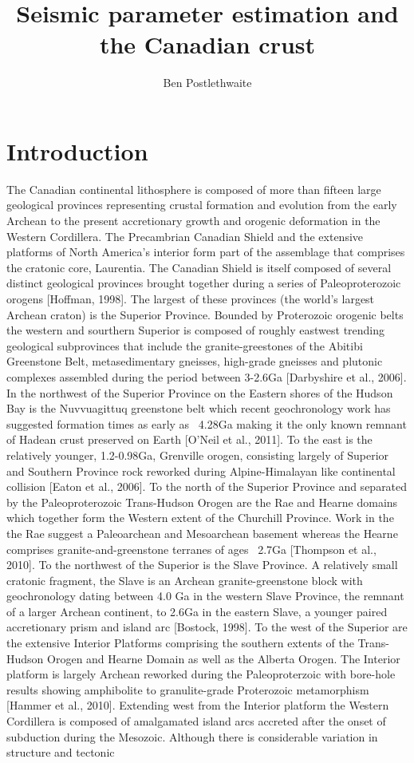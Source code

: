\documentclass[draft, 12pt]{article}
\title{Seismic parameter estimation and the Canadian crust}
\author{Ben Postlethwaite}
\begin{document}
\begin{abstract}

\end{abstract}

\section{Introduction}

The Canadian continental lithosphere is composed of more than fifteen large geological provinces representing crustal formation and evolution from the early Archean to the present accretionary growth and orogenic deformation in the Western Cordillera. The Precambrian Canadian Shield and the extensive platforms of North America's interior form part of the assemblage that comprises the cratonic core, Laurentia. The Canadian Shield is itself composed of several distinct geological provinces brought together during a series of Paleoproterozoic orogens [Hoffman, 1998]. The largest of these provinces (the world's largest Archean craton) is the Superior Province. Bounded by Proterozoic orogenic belts the western and sourthern Superior is composed of roughly eastwest trending geological subprovinces that include the granite-greestones of the Abitibi Greenstone Belt, metasedimentary gneisses, high-grade gneisses and plutonic complexes assembled during the period between 3-2.6Ga [Darbyshire et al., 2006]. In the northwest of the Superior Province on the Eastern shores of the Hudson Bay is the Nuvvuagittuq greenstone belt which recent geochronology work has suggested formation times as early as ~4.28Ga making it the only known remnant of Hadean crust preserved on Earth [O'Neil et al., 2011]. To the east is the relatively younger, 1.2-0.98Ga, Grenville orogen, consisting largely of Superior and Southern Province rock reworked during Alpine-Himalayan like continental collision [Eaton et al., 2006]. To the north of the Superior Province and separated by the Paleoproterozoic Trans-Hudson Orogen are the Rae and Hearne domains which together form the Western extent of the Churchill Province. Work in the the Rae suggest a Paleoarchean and Mesoarchean basement whereas the Hearne comprises granite-and-greenstone terranes of ages ~2.7Ga [Thompson et al., 2010]. To the northwest of the Superior is the Slave Province. A relatively small cratonic fragment, the Slave is an Archean granite-greenstone block with geochronology dating between 4.0 Ga in the western Slave Province, the remnant of a larger Archean continent, to 2.6Ga in the eastern Slave, a younger paired accretionary prism and island arc [Bostock, 1998]. To the west of the Superior are the extensive Interior Platforms comprising the southern extents of the Trans-Hudson Orogen and Hearne Domain as well as the Alberta Orogen. The Interior platform is largely Archean reworked during the Paleoproterzoic with bore-hole results showing amphibolite to granulite-grade Proterozoic metamorphism [Hammer et al., 2010]. Extending west from the Interior platform the Western Cordillera is composed of amalgamated island arcs accreted after the onset of subduction during the Mesozoic. Although there is considerable variation in structure and tectonic 
\end{document}
